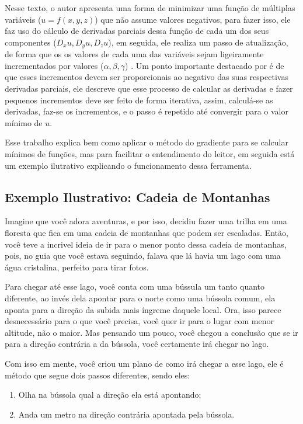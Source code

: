 Nesse texto, o autor apresenta uma forma de minimizar uma função de múltiplas variáveis ($u=f(x,y,z)$) que não assume valores negativos, para fazer isso, ele faz uso do cálculo de derivadas parciais dessa função de cada um dos seus componentes ($D_x u, D_y u, D_z u$), em seguida, ele realiza um passo de atualização, de forma que os os valores de cada uma das variáveis sejam ligeiramente incrementados por valores ($\alpha, \beta, \gamma$) \parencite{CauchyMetodoDoGradiente}. Um ponto importante destacado por \textcite{CauchyMetodoDoGradiente} é de que esses incrementos devem ser proporcionais ao negativo das suas respectivas derivadas parciais, ele descreve que esse processo de calcular as derivadas e fazer pequenos incrementos deve ser feito de forma iterativa, assim, calculá-se as derivadas, faz-se os incrementos, e o passo é repetido até convergir para o valor mínimo de $u$.

Esse trabalho explica bem como aplicar o método do gradiente para se calcular mínimos de funções, mas para facilitar o entendimento do leitor, em seguida está um exemplo ilutrativo explicando o funcionamento dessa ferramenta.

\subsection{Exemplo Ilustrativo: Cadeia de Montanhas}

Imagine que você adora aventuras, e por isso, decidiu fazer uma trilha em uma floresta que fica em uma cadeia de montanhas que podem ser escaladas. Então, você teve a incrivel ideia de ir para o menor ponto dessa cadeia de montanhas, pois, no guia que você estava seguindo, falava que lá havia um lago com uma água cristalina, perfeito para tirar fotos.

Para chegar até esse lago, você conta com uma bússula um tanto quanto diferente, ao invés dela apontar para o norte como uma bússola comum, ela aponta para a direção da subida mais íngreme daquele local. Ora, isso parece desnecessário para o que você precisa, você quer ir para o lugar com menor altitude, não o maior. Mas pensando um pouco, você chegou a conclusão que se ir para a direção contrária a da bússola, você certamente irá chegar no lago.

Com isso em mente, você criou um plano de como irá chegar a esse lago, ele é método que segue dois passos diferentes, sendo eles:

\begin{enumerate}
    \item Olha na bússola qual a direção ela está apontando;
    \item Anda um metro na direção contrária apontada pela bússola.
\end{enumerate}

